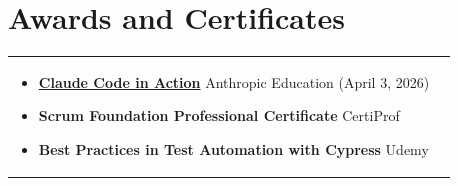 \documentclass[a4paper,8pt]{article}
\begin{document}
\section{Awards and Certificates}
\begin{tabularx}{\linewidth}{ @{}l r@{} }
\begin{minipage}[t]{\linewidth}
    \begin{itemize}[nosep,after=\strut, leftmargin=2em, itemsep=2pt]
        \item \textbf{\href{https://verify.skilljar.com/c/b7pedaccpvjp}{Claude Code in Action}} Anthropic Education (April 3, 2026)
        \item \textbf{Scrum Foundation Professional Certificate} CertiProf
        \item \textbf{Best Practices in Test Automation with Cypress} Udemy
    \end{itemize}
    \end{minipage}
\end{tabularx}\\[3pt]
\end{document}
